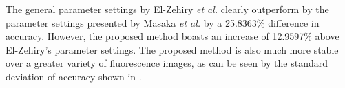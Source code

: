 \documentclass[10pt, journal, letterpaper, onecolumn, draftcls]{IEEEtran}
\begin{document}
The general parameter settings by El-Zehiry \textit{et al.} %
clearly outperform by the parameter settings presented by Masaka \textit{et al.} %
by a 25.8363\% difference in accuracy. However, the proposed method boasts an increase of 12.9597\% above El-Zehiry's parameter settings. The proposed method is also much more stable over a greater variety of fluorescence images, as can be seen by the standard deviation of accuracy shown in .













%
%



%
%
\end{document}
